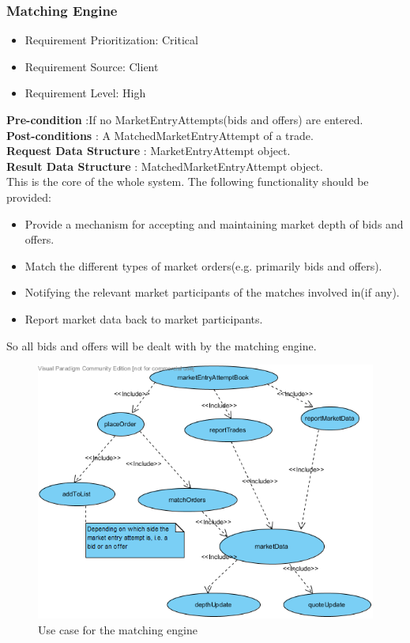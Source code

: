 \documentclass[12pt]{article}
\begin{document}
				\subsubsection{Matching Engine}
				\begin{itemize}
					\item Requirement Prioritization: Critical
					\item Requirement Source: Client 	
					\item Requirement Level: High
				\end{itemize}
			 	
				\textbf{Pre-condition} :If no MarketEntryAttempts(bids and offers) are entered.\\
			 	\textbf{Post-conditions} : A MatchedMarketEntryAttempt of a trade.\\ 
			 	\textbf{Request Data Structure} : MarketEntryAttempt object.\\
			 	\textbf{Result Data Structure} : MatchedMarketEntryAttempt object.\\
			 	
				This is the core of the whole system. The following functionality should be provided:
					\begin{itemize}
						\item Provide a mechanism for accepting and maintaining market depth of bids and offers.
						\item Match the different types of market orders(e.g. primarily bids and offers).
						\item Notifying the relevant market participants of the matches involved in(if any).
						\item Report market data back to market participants.
					\end{itemize}
				So all bids and offers will be dealt with by the matching engine.	
				
						\begin{figure}[th]
						\centering
						\includegraphics[scale=0.8]{./matching_engine_use_case}
						\caption{Use case for the matching engine}
						\label{matching engine use case}
						\end{figure}
				\pagebreak
				
\end{document}
